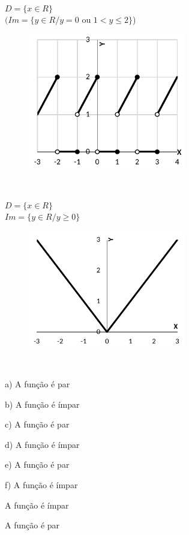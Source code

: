 \begin{respostas}{5}
~~

	\ansitem{} \( D= \{ x \in R \}  \) \\ $( Im= \{ y \in {R} / y=0 $ ou $ 1<y \leq 2 \}  $) 

	\begin{figure}[H]
		\begin{Center}
			\includegraphics[width=2.7in,height=2.32in]{capitulos/outras_funcoes/media/image78.pdf}
		\end{Center}
	\end{figure}
~~

	\ansitem{} \( D= \{ x \in R \} \) \\ \( Im= \{ y \in R/y \geq 0 \}  \)

	\begin{figure}[H]
		\begin{Center}
			\includegraphics[width=2.69in,height=2.01in]{capitulos/outras_funcoes/media/image79.pdf}
		\end{Center}
	\end{figure}
\end{respostas}
~~

\begin{respostas}{6}
	\ansitem{} a) A função é par\quad 

	b) A função é ímpar

	c) A função é par

	d) A função é ímpar

	e) A função é par

	f) A função é ímpar

	\ansitem{} A função é ímpar

	\ansitem{} A função é par

\end{respostas}

